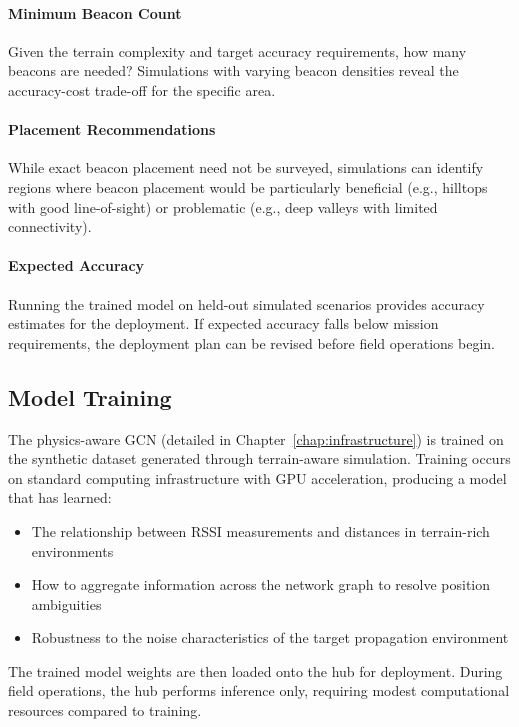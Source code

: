 \documentclass[master,final,11pt]{iscs-thesis}
\begin{document}
\paragraph{Minimum Beacon Count}
Given the terrain complexity and target accuracy requirements, how many beacons are needed?
Simulations with varying beacon densities reveal the accuracy-cost trade-off for the specific area.

\paragraph{Placement Recommendations}
While exact beacon placement need not be surveyed, simulations can identify regions where beacon placement would be particularly beneficial (e.g., hilltops with good line-of-sight) or problematic (e.g., deep valleys with limited connectivity).

\paragraph{Expected Accuracy}
Running the trained model on held-out simulated scenarios provides accuracy estimates for the deployment.
If expected accuracy falls below mission requirements, the deployment plan can be revised before field operations begin.

\subsection{Model Training}

The physics-aware GCN (detailed in Chapter~\ref{chap:infrastructure}) is trained on the synthetic dataset generated through terrain-aware simulation.
Training occurs on standard computing infrastructure with GPU acceleration, producing a model that has learned:
\begin{itemize}
    \item The relationship between RSSI measurements and distances in terrain-rich environments
    \item How to aggregate information across the network graph to resolve position ambiguities
    \item Robustness to the noise characteristics of the target propagation environment
\end{itemize}

The trained model weights are then loaded onto the hub for deployment.
During field operations, the hub performs inference only, requiring modest computational resources compared to training.
\end{document}
